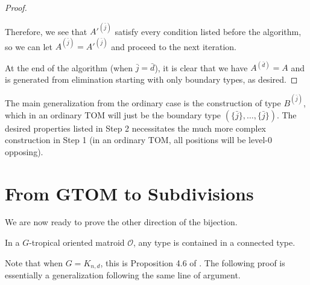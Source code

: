\documentclass[letterpaper,reqno,11pt]{amsart}
\begin{document}
\begin{proof}
\begin{itemize}
        Therefore, we see that $A'^{(\bar{j})}$ satisfy every condition listed before the algorithm, so we can let $A^{(\bar{j})} = A'^{(\bar{j})}$ and proceed to the next iteration.
    \end{itemize}

    At the end of the algorithm (when $\bar{j} = \bar{d}$), it is clear that we have $A^{(\bar{d})} = A$ and is generated from elimination starting with only boundary types, as desired.
\end{proof}

\begin{remark}
    The main generalization from the ordinary case is the construction of type $B^{(\bar{j})}$, which in an ordinary TOM will just be the boundary type $(\{\bar{j}\}, \dots, \{\bar{j}\})$. The desired properties listed in Step 2 necessitates the much more complex construction in Step 1 (in an ordinary TOM, all positions will be level-0 opposing).
\end{remark}

\section{From GTOM to Subdivisions}\label{sec:gtom_to_subdiv}

We are now ready to prove the other direction of the bijection.

\begin{proposition}\label{prop:conn}
    In a $G$-tropical oriented matroid $\mathcal{O}$, any type is contained in a connected type.
\end{proposition} 

Note that when $G = K_{n,d}$, this is Proposition 4.6 of \cite{ardila2007tropical}. The following proof is essentially a generalization following the same line of argument.
\end{document}
